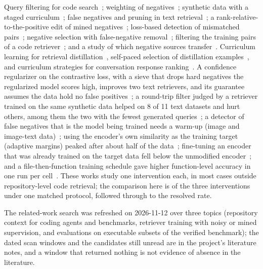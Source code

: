 \documentclass[10pt,twocolumn]{article}
\makeatletter
\renewcommand\paragraph{\@startsection{paragraph}{4}{\z@}{3pt}{-0.5em}{\normalfont\bfseries}}
\makeatother
\begin{document}
\paragraph{Training-data quality for retrievers.} Query filtering for code search~\cite{sun}; weighting
of negatives~\cite{rethinking}; synthetic data with a staged curriculum~\cite{coder}; false
negatives and pruning in text retrieval~\cite{rlhn}; a rank-relative-to-the-positive edit of mined
negatives~\cite{arhn}; loss-based detection of mismatched pairs~\cite{npc}; negative selection with
false-negative removal~\cite{nvretriever}; filtering the training pairs of a code retriever~\cite{map4cs};
and a study of which negative sources transfer~\cite{hardneg}. Curriculum learning for retrieval
distillation~\cite{cldrd}, self-paced selection of distillation examples~\cite{adam}, and curriculum strategies for
conversation response ranking~\cite{penha}.
A confidence regularizer on the contrastive loss, with a sieve that drops hard negatives the regularized model scores high, improves two text
retrievers, and its guarantee assumes the data hold no false positives~\cite{ccr}; %
a round-trip filter judged by a retriever trained on the same synthetic data helped on 8 of 11 text datasets and hurt others, among them the two with the fewest generated queries~\cite{promptagator};
a detector of false negatives that is the model being trained needs a warm-up (image and image-text data)~\cite{glofnd};
using the encoder's own similarity as the training target (adaptive margins) peaked after about half of the data~\cite{selfdistill};
fine-tuning an encoder that was already trained on the target data fell below the unmodified encoder~\cite{finetuningfails};
and a file-then-function training schedule gave higher function-level accuracy in one run per cell~\cite{mmissueloc}.
These works study one intervention each, in
most cases outside repository-level code retrieval; the comparison here is of the three
interventions under one matched protocol, followed through to the resolved rate.

The related-work search was refreshed on 2026-11-12 over three topics (repository context for coding agents and benchmarks, retriever
training with noisy or mined supervision, and evaluations on executable subsets of the verified benchmark); the dated scan windows and the
candidates still unread are in the project's literature notes, and a window that returned nothing is not evidence of absence in the literature.
\end{document}
